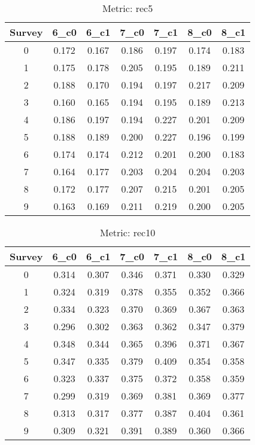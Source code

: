 \documentclass{article}
\begin{document}
\begin{table}[tbh]
\begin{center}
\begin{tabular}{|*{7}{c|}}
\hline
 Survey & 6\_c0 & 6\_c1 & 7\_c0 & 7\_c1 & 8\_c0 & 8\_c1 \\ 
\hline
0 & 0.172 & 0.167 & 0.186 & 0.197 & 0.174 & 0.183 \\ 
1 & 0.175 & 0.178 & 0.205 & 0.195 & 0.189 & 0.211 \\ 
2 & 0.188 & 0.170 & 0.194 & 0.197 & 0.217 & 0.209 \\ 
3 & 0.160 & 0.165 & 0.194 & 0.195 & 0.189 & 0.213 \\ 
4 & 0.186 & 0.197 & 0.194 & 0.227 & 0.201 & 0.209 \\ 
5 & 0.188 & 0.189 & 0.200 & 0.227 & 0.196 & 0.199 \\ 
6 & 0.174 & 0.174 & 0.212 & 0.201 & 0.200 & 0.183 \\ 
7 & 0.164 & 0.177 & 0.203 & 0.204 & 0.204 & 0.203 \\ 
8 & 0.172 & 0.177 & 0.207 & 0.215 & 0.201 & 0.205 \\ 
9 & 0.163 & 0.169 & 0.211 & 0.219 & 0.200 & 0.205 \\ 
\hline
\end{tabular}
\end{center}
\caption{Metric: rec5}
\end{table}


\begin{table}[tbh]
\begin{center}
\begin{tabular}{|*{7}{c|}}
\hline
 Survey & 6\_c0 & 6\_c1 & 7\_c0 & 7\_c1 & 8\_c0 & 8\_c1 \\ 
\hline
0 & 0.314 & 0.307 & 0.346 & 0.371 & 0.330 & 0.329 \\ 
1 & 0.324 & 0.319 & 0.378 & 0.355 & 0.352 & 0.366 \\ 
2 & 0.334 & 0.323 & 0.370 & 0.369 & 0.367 & 0.363 \\ 
3 & 0.296 & 0.302 & 0.363 & 0.362 & 0.347 & 0.379 \\ 
4 & 0.348 & 0.344 & 0.365 & 0.396 & 0.371 & 0.367 \\ 
5 & 0.347 & 0.335 & 0.379 & 0.409 & 0.354 & 0.358 \\ 
6 & 0.323 & 0.337 & 0.375 & 0.372 & 0.358 & 0.359 \\ 
7 & 0.299 & 0.319 & 0.369 & 0.381 & 0.369 & 0.377 \\ 
8 & 0.313 & 0.317 & 0.377 & 0.387 & 0.404 & 0.361 \\ 
9 & 0.309 & 0.321 & 0.391 & 0.389 & 0.360 & 0.366 \\ 
\hline
\end{tabular}
\end{center}
\caption{Metric: rec10}
\end{table}
\end{document}
